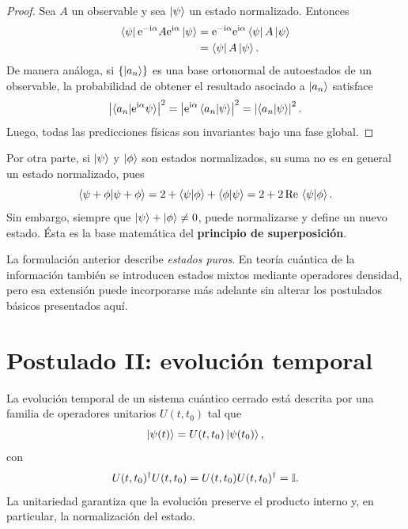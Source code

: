 \documentclass[../main.tex]{subfiles}
\begin{document}
\begin{proof}
Sea $A$ un observable y sea $\ket{\psi}$ un estado normalizado. Entonces
\begin{align*}
    \bra{\psi}\mathrm{e}^{-\mathrm{i}\alpha}A\mathrm{e}^{\mathrm{i}\alpha}\ket{\psi}
    &=
    \mathrm{e}^{-\mathrm{i}\alpha}\mathrm{e}^{\mathrm{i}\alpha}\bra{\psi}A\ket{\psi}\\
    &=
    \bra{\psi}A\ket{\psi}.
\end{align*}
De manera análoga, si $\{\ket{a_n}\}$ es una base ortonormal de autoestados de un observable, la probabilidad de obtener el resultado asociado a $\ket{a_n}$ satisface
\begin{equation*}
    \left|\braket{a_n|\mathrm{e}^{\mathrm{i}\alpha}\psi}\right|^2
    =
    \left|\mathrm{e}^{\mathrm{i}\alpha}\braket{a_n|\psi}\right|^2
    =
    \left|\braket{a_n|\psi}\right|^2.
\end{equation*}
Luego, todas las predicciones físicas son invariantes bajo una fase global.
\end{proof}

Por otra parte, si $\ket{\psi}$ y $\ket{\phi}$ son estados normalizados, su suma no es en general un estado normalizado, pues
\begin{equation*}
    \braket{\psi+\phi|\psi+\phi}
    =
    2+\braket{\psi|\phi}+\braket{\phi|\psi}
    =
    2+2\,\mathrm{Re}\,\braket{\psi|\phi}.
\end{equation*}
Sin embargo, siempre que $\ket{\psi}+\ket{\phi}\neq 0$, puede normalizarse y define un nuevo estado. Ésta es la base matemática del \textbf{principio de superposición}.

\begin{observacion}
La formulación anterior describe \emph{estados puros}. En teoría cuántica de la información también se introducen estados mixtos mediante operadores densidad, pero esa extensión puede incorporarse más adelante sin alterar los postulados básicos presentados aquí.
\end{observacion}


\section{Postulado II: evolución temporal}

La evolución temporal de un sistema cuántico cerrado está descrita por una familia de operadores unitarios $U(t,t_0)$ tal que
\begin{equation*}
    \ket{\psi(t)} = U(t,t_0)\ket{\psi(t_0)},
\end{equation*}
con
\begin{equation*}
    U(t,t_0)^\dagger U(t,t_0)=U(t,t_0)U(t,t_0)^\dagger=\mathbb{I}.
\end{equation*}
La unitariedad garantiza que la evolución preserve el producto interno y, en particular, la normalización del estado.
\end{document}
